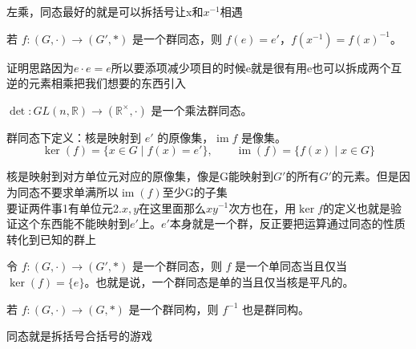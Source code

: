 \begin{note}[定义1 16群同态]
左乘，同态最好的就是可以拆括号让x和$x^{-1}$相遇
\end{note}

\begin{proposition}
若 $f:(G,\cdot)\to(G',*)$ 是一个群同态，则 $f(e)=e'$，$f(x^{-1})=f(x)^{-1}$。
\end{proposition}

\begin{note}[命题1 13群同态单位元对单位元逆元对逆元]
证明思路因为$e\cdot e=e$所以要添项减少项目的时候e就是很有用e也可以拆成两个互逆的元素相乘把我们想要的东西引入
\end{note}

\begin{proposition}
$\det:GL(n,\mathbb{R})\to(\mathbb{R}^\times,\cdot)$ 是一个乘法群同态。
\end{proposition}

\begin{definition}[核与像（定义 1.15）]
群同态下定义：核是映射到 $e'$ 的原像集，$\operatorname{im}f$ 是像集。
\[
\ker(f)=\{x\in G\mid f(x)=e'\},\qquad\operatorname{im}(f)=\{f(x)\mid x\in G\}
\]
\end{definition}

\begin{note}
核是映射到对方单位元对应的原像集，像是G能映射到$G'$的所有$G'$的元素。但是因为同态不要求单满所以$\operatorname{im}(f)$至少G的子集 \\
要证两件事1有单位元2.$x,y$在这里面那么$xy^{-1}$次方也在，用$\ker f$的定义也就是验证这个东西能不能映射到$e'$上。$e'$本身就是一个群，反正要把运算通过同态的性质转化到已知的群上
\end{note}

\begin{proposition}[命题 1.16]
令 $f:(G,\cdot)\to(G',*)$ 是一个群同态，则 $f$ 是一个单同态当且仅当 $\ker(f)=\{e\}$。也就是说，一个群同态是单的当且仅当核是平凡的。
\end{proposition}

\begin{proposition}[命题 1.17：同态就是拆括号的游戏]
若 $f:(G,\cdot)\to(G,*)$ 是一个群同构，则 $f^{-1}$ 也是群同构。
\end{proposition}

\begin{note}[命题1 17同态就是拆括号的游戏]
同态就是拆括号合括号的游戏
\end{note}


